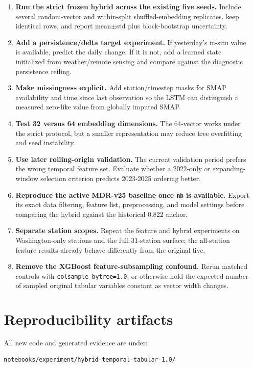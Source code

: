 \documentclass[11pt]{article}
\newcommand{\code}[1]{\begingroup\footnotesize\nolinkurl{#1}\endgroup}
\begin{document}
\begin{enumerate}
\item \textbf{Run the strict frozen hybrid across the existing five seeds.} Include several random-vector and within-split shuffled-embedding replicates, keep identical rows, and report mean$\pm$std plus block-bootstrap uncertainty.
\item \textbf{Add a persistence/delta target experiment.} If yesterday's in-situ value is available, predict the daily change. If it is not, add a learned state initialized from weather/remote sensing and compare against the diagnostic persistence ceiling.
\item \textbf{Make missingness explicit.} Add station/timestep masks for SMAP availability and time since last observation so the LSTM can distinguish a measured zero-like value from globally imputed SMAP.
\item \textbf{Test 32 versus 64 embedding dimensions.} The 64-vector works under the strict protocol, but a smaller representation may reduce tree overfitting and seed instability.
\item \textbf{Use later rolling-origin validation.} The current validation period prefers the wrong temporal feature set. Evaluate whether a 2022-only or expanding-window selection criterion predicts 2023-2025 ordering better.
\item \textbf{Reproduce the active MDR-v25 baseline once \code{nb} is available.} Export its exact data filtering, feature list, preprocessing, and model settings before comparing the hybrid against the historical 0.822 anchor.
\item \textbf{Separate station scopes.} Repeat the feature and hybrid experiments on Washington-only stations and the full 31-station surface; the all-station feature results already behave differently from the original five.
\item \textbf{Remove the XGBoost feature-subsampling confound.} Rerun matched controls with \code{colsample_bytree=1.0}, or otherwise hold the expected number of sampled original tabular variables constant as vector width changes.
\end{enumerate}

\section{Reproducibility artifacts}

All new code and generated evidence are under:

\begin{Verbatim}[fontsize=\small,frame=single,rulecolor=\color{lightgray}]
notebooks/experiment/hybrid-temporal-tabular-1.0/
\end{Verbatim}
\end{document}
